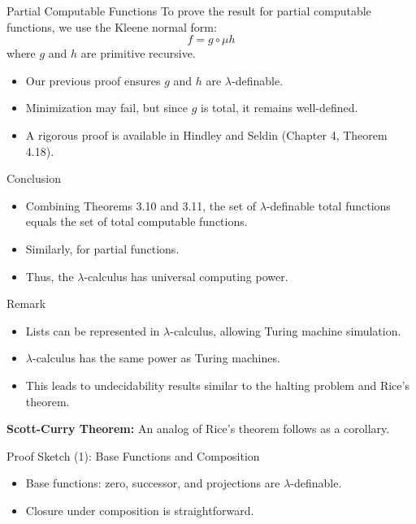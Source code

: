 \documentclass{beamer}
\begin{document}
\begin{frame}{Partial Computable Functions}
  To prove the result for partial computable functions, we use the Kleene normal form:
  \[
  f = g \circ \mu h
  \]
  where $g$ and $h$ are primitive recursive.
  \begin{itemize}
      \item Our previous proof ensures $g$ and $h$ are $\lambda$-definable.
      \item Minimization may fail, but since $g$ is total, it remains well-defined.
      \item A rigorous proof is available in Hindley and Seldin (Chapter 4, Theorem 4.18).
  \end{itemize}
\end{frame}

\begin{frame}{Conclusion}
  \begin{itemize}
      \item Combining Theorems 3.10 and 3.11, the set of $\lambda$-definable total functions equals the set of total computable functions.
      \item Similarly, for partial functions.
      \item Thus, the $\lambda$-calculus has universal computing power.
  \end{itemize}
\end{frame}

\begin{frame}{Remark}
  \begin{itemize}
      \item Lists can be represented in $\lambda$-calculus, allowing Turing machine simulation.
      \item $\lambda$-calculus has the same power as Turing machines.
      \item This leads to undecidability results similar to the halting problem and Rice’s theorem.
  \end{itemize}
  \textbf{Scott-Curry Theorem:} An analog of Rice’s theorem follows as a corollary.
\end{frame}



\begin{frame}{Proof Sketch (1): Base Functions and Composition}
  \begin{itemize}
    \item Base functions: zero, successor, and projections are \(\lambda\)-definable.
    \item Closure under composition is straightforward.
  \end{itemize}
\end{frame}
\end{document}

